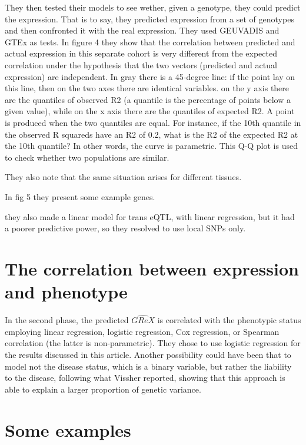 \documentclass[../main.tex]{subfiles}
\begin{document}
They then tested their models to see wether, given a genotype, they 
could predict the expression. That is to say, they predicted expression 
from a set of genotypes and then confronted it with the real expression. 
They used GEUVADIS and GTEx as tests. In figure 4 they show that the 
correlation between predicted and actual expression in this separate 
cohort is very different from the expected correlation under the 
hypothesis that the two vectors (predicted and actual expression) are 
independent. In gray there is a 45-degree line: if the point lay on this 
line, then on the two axes there are identical variables. on the y axis 
there are the quantiles of observed R2 (a quantile is the percentage of 
points below a given value), while on the x axis there are the quantiles 
of expected R2. A point is produced when the two quantiles are equal. 
For instance, if the 10th quantile in the observed R squareds have an R2 
of 0.2, what is the R2 of the expected R2 at the 10th quantile? In other 
words, the curve is parametric. This Q-Q plot is used to check whether 
two populations are similar.

They also note that the same situation arises for different tissues.

In fig 5 they present some example genes.

they also made a linear model for trans eQTL, with linear regression, 
but it had a poorer predictive power, so they resolved to use local SNPs 
only.

\section{The correlation between expression and phenotype}

In the second phase, the predicted $\hat{GReX}$ is correlated with the 
phenotypic status employing linear regression, logistic regression, Cox 
regression, or Spearman correlation (the latter is non-parametric). They 
chose to use logistic regression for the results discussed in this 
article. Another possibility could have been that to model not the 
disease status, which is a binary variable, but rather the liability to 
the disease, following what Vissher\cite{Visscher2008} reported, showing 
that this approach is able to explain a larger proportion of genetic 
variance.

\section{Some examples}
\end{document}
